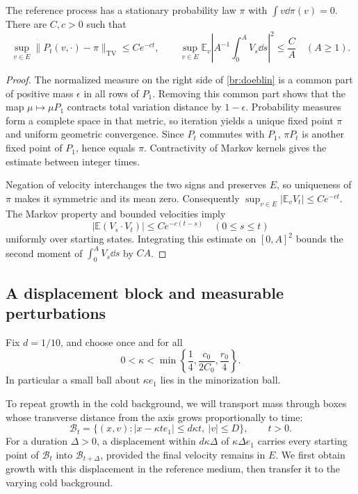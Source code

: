 \begin{lemma}\label{br:mixing}
The reference process has a stationary probability law \(\pi\) with
\(\int v\dd\pi(v)=0\). There are \(C,c>0\) such that
\[
\sup_{v\in E}\|P_t(v,\cdot)-\pi\|_{\mathrm{TV}}\le Ce^{-ct},
\qquad
\sup_{v\in E}\mathbb E_v\left|
A^{-1}\int_0^A V_s\dd s\right|^2\le\frac C A\quad(A\ge1).
\]
\end{lemma}

\begin{proof}
The normalized measure on the right side of \eqref{br:doeblin} is a
common part of positive mass \(\epsilon\) in all rows of \(P_1\).
Removing this common part shows that the map \(\mu\mapsto\mu P_1\)
contracts total variation distance by \(1-\epsilon\). Probability
measures form a complete space in that metric, so iteration yields a
unique fixed point \(\pi\) and uniform geometric convergence.
Since \(P_t\) commutes with \(P_1\), \(\pi P_t\) is another fixed point
of \(P_1\), hence equals \(\pi\). Contractivity of Markov kernels gives
the estimate between integer times.

Negation of velocity interchanges the two signs and preserves \(E\),
so uniqueness of \(\pi\) makes it symmetric and its mean zero.
Consequently \(\sup_{v\in E}|\mathbb E_vV_t|\le Ce^{-ct}\).
The Markov property and bounded velocities imply
\[
|\mathbb E(V_s\cdot V_t)|\le Ce^{-c(t-s)}\quad(0\le s\le t)
\]
uniformly over starting states. Integrating this estimate on
\([0,A]^2\) bounds the second moment of \(\int_0^A V_s\dd s\) by \(CA\).
\end{proof}

\subsection{A displacement block and measurable perturbations}

Fix \(d=1/10\), and choose once and for all
\begin{equation}\label{br:kappa-choice}
0<\kappa<\min\left\{\frac14,\frac{c_0}{2C_0},\frac{r_0}{4}\right\}.
\end{equation}
In particular a small ball about \(\kappa e_1\) lies in the
minorization ball.

To repeat growth in the cold background, we will transport mass through
boxes whose transverse distance from the axis grows proportionally to time:
\[
\mathcal B_t=\{(x,v):|x-\kappa te_1|\le d\kappa t,\ |v|\le D\},
\qquad t>0.
\]
For a duration \(\Delta>0\), a displacement within
\(d\kappa\Delta\) of \(\kappa\Delta e_1\)
carries every starting point of \(\mathcal B_t\) into
\(\mathcal B_{t+\Delta}\), provided the final velocity remains in
\(E\). We first obtain growth with this displacement in the reference
medium, then transfer it to the varying cold background.

